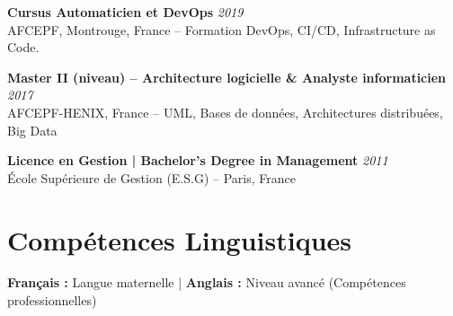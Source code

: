 \documentclass[11pt,a4paper]{article}
\begin{document}
\textbf{Cursus Automaticien et DevOps} \hfill \textit{\color{mediumgray}2019}\\
AFCEPF, Montrouge, France -- Formation DevOps, CI/CD, Infrastructure as Code. 

\textbf{Master II (niveau) -- Architecture logicielle \& Analyste informaticien} \hfill \textit{\color{mediumgray}2017}\\
AFCEPF-HENIX, France -- UML, Bases de données, Architectures distribuées, Big Data

\textbf{Licence en Gestion | Bachelor's Degree in Management} \hfill \textit{\color{mediumgray}2011}\\
École Supérieure de Gestion (E.S.G) -- Paris, France

\section*{Compétences Linguistiques}

\textbf{Français :} Langue maternelle \quad | \quad \textbf{Anglais :} Niveau avancé (Compétences professionnelles)
\end{document}
